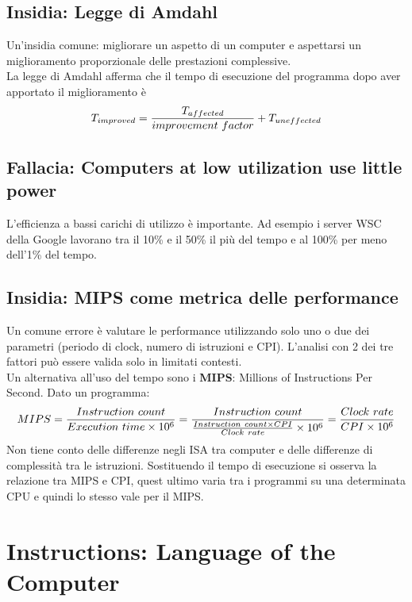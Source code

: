 \documentclass[12pt,a4paper]{article}
\begin{document}
\subsection{Insidia: Legge di Amdahl}
Un'insidia comune: migliorare un aspetto di un computer e aspettarsi un miglioramento proporzionale delle prestazioni complessive.\\
La legge di Amdahl afferma che il tempo di esecuzione del programma dopo aver apportato il miglioramento è
$$T_{improved} = {T_{affected} \over improvement\ factor}+ T_{uneffected}$$

\subsection{Fallacia: Computers at low utilization use little power}
L'efficienza a bassi carichi di utilizzo è importante. Ad esempio i server WSC della Google lavorano tra il 10\% e il 50\% il più del tempo e al 100\% per meno dell'1\% del tempo.

\subsection{Insidia: MIPS come metrica delle performance}
Un comune errore è valutare le performance utilizzando solo uno o due dei parametri (periodo di clock, numero di istruzioni e CPI). L'analisi con 2 dei tre fattori può essere valida solo in limitati contesti.\\
Un alternativa all'uso del tempo sono i \textbf{MIPS}: Millions of Instructions Per Second. Dato un programma:\\
$$MIPS = {Instruction\ count \over Execution\ time \times 10^6} = {Instruction\ count \over {Instruction\ count \times CPI \over Clock\ rate} \times 10^6} = {Clock\ rate \over CPI \times 10^6}$$
Non tiene conto delle differenze negli ISA tra computer e delle differenze di complessità tra le istruzioni. Sostituendo il tempo di esecuzione si osserva la relazione tra MIPS e CPI, quest ultimo varia tra i programmi su una determinata CPU e quindi lo stesso vale per il MIPS.

\clearpage
\section{Instructions: Language of the Computer}
\end{document}
